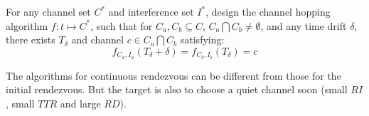 \begin{problem}
For any channel set $C^*$ and interference set $I^*$, design the
channel hopping algorithm $f: t\mapsto C^*$, such that for $C_a, C_b
\subseteq C$, $C_a \bigcap C_b \neq \emptyset$, and any time drift
$\delta$, there exists $T_{\delta}$ and channel $c \in C_a \bigcap
C_b$ satisfying:
\begin{equation*}
f_{C_a, I_a}(T_{\delta}+\delta) = f_{C_b, I_b}(T_{\delta}) = c
\end{equation*}
\end{problem}

The algorithms for continuous rendezvous can be different from those
for the initial rendezvous. But the target is also to choose a quiet channel soon (small $RI$, small $TTR$ and large $RD$).


